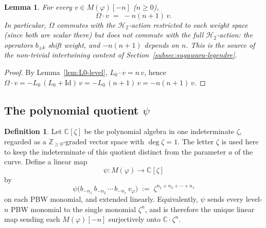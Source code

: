 \documentclass[12pt]{amsart}
\theoremstyle{plain}
\newtheorem{lemma}[theorem]{Lemma}
\theoremstyle{definition}
\newtheorem{definition}[theorem]{Definition}
\newcommand{\CC}{\mathbb{C}}
\newcommand{\ZZ}{\mathbb{Z}}
\newcommand{\Mf}{M(\varphi)}          %
\newcommand{\vf}{v_\varphi}           %
\newcommand{\Om}{\Omega}              %
\begin{document}
\begin{lemma}
\label{lem:Omega-scalar}
For every $v \in \Mf[-n]$ ($n\geq 0$),
\begin{equation}\label{eq:Omega-scalar}
  \Om\cdot v \;=\; -n(n+1)\,v.
\end{equation}
In particular, $\Om$ commutes with the $\mathcal{H}_2$-action restricted to
each weight space (since both are scalar there) but does \emph{not} commute
with the full $\mathcal{H}_2$-action: the operators $b_{\pm k}$ shift weight,
and $-n(n+1)$ depends on $n$. This is the source of the non-trivial
intertwining content of Section~\ref{subsec:sugawara-legendre}.
\end{lemma}

\begin{proof}
By Lemma~\ref{lem:L0-level}, $L_0\cdot v = n\,v$, hence
$\Om\cdot v = -L_0\,(L_0+\mathrm{Id})\,v = -L_0\,(n+1)\,v = -n(n+1)\,v$.
\end{proof}

\subsection{The polynomial quotient $\psi$}
\label{subsec:polynomial-quotient}

\begin{definition}
\label{def:psi-quotient}
Let $\CC[\zeta]$ be the polynomial algebra in one indeterminate $\zeta$, regarded
as a $\ZZ_{\geq 0}$-graded vector space with $\deg \zeta = 1$. The letter $\zeta$ is used here to keep the indeterminate of this quotient distinct from the parameter $a$ of the curve.
Define a linear map
\[
  \psi\colon \Mf \longrightarrow \CC[\zeta]
\]
by
\begin{equation}\label{eq:psi-quotient}
  \psi\bigl(b_{-n_1}\,b_{-n_2}\,\cdots\,b_{-n_s}\,\vf\bigr)
  \;:=\; \zeta^{n_1+n_2+\cdots+n_s}
\end{equation}
on each PBW monomial, and extended linearly. Equivalently, $\psi$ sends
every level-$n$ PBW monomial to the single monomial $\zeta^n$, and is therefore
the unique linear map sending each $\Mf[-n]$ surjectively onto
$\CC\cdot \zeta^n$.
\end{definition}
\end{document}
